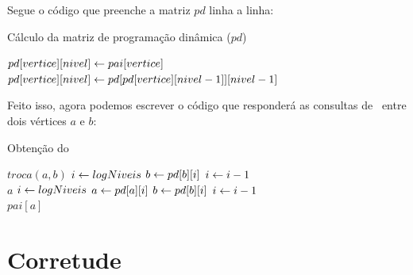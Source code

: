\vspace{0.2cm}

Segue o código que preenche a matriz $pd$ linha a linha:

\begin{algorithm}[H]
\caption{Cálculo da matriz de programação dinâmica ($pd$)}
\begin{algorithmic}[1]
                \State $pd[vertice][nivel] \leftarrow pai[vertice]$
            \Else
                \State $pd[vertice][nivel] \leftarrow pd[pd[vertice][nivel-1]][nivel-1]$
            \EndIf
        \EndFor
    \EndFor
\EndFunction
\end{algorithmic}
\end{algorithm}

Feito isso, agora podemos escrever o código que responderá as consultas de \LCA\ entre dois vértices $a$ e $b$:

\vspace{0.2cm}

\begin{algorithm}[H]
\caption{Obtenção do \LCA}
\begin{algorithmic}[1]
        \State $troca(a, b)$
    \EndIf
    \State $i \leftarrow logNiveis$
            \State $b \leftarrow pd[b][i]$
        \EndIf
        \vspace{-0.2cm}
        \State $i \leftarrow i - 1$
    \EndWhile
        \\\hspace{11mm} \Return $a$
    \EndIf
    \State $i \leftarrow logNiveis$
            \State $a \leftarrow pd[a][i]$
            \State $b \leftarrow pd[b][i]$
        \EndIf
        \vspace{-0.2cm}
        \State $i \leftarrow i - 1$
    \EndWhile
    \\\hspace{5mm} \Return $pai[a]$
\EndFunction
\end{algorithmic}
\end{algorithm}

\vspace{10cm}

\section{Corretude}

